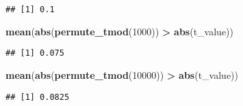 \documentclass[
]{article}
\newenvironment{Shaded}{\begin{snugshade}}{\end{snugshade}}
\newcommand{\ControlFlowTok}[1]{\textcolor[rgb]{0.13,0.29,0.53}{\textbf{#1}}}
\newcommand{\DataTypeTok}[1]{\textcolor[rgb]{0.13,0.29,0.53}{#1}}
\newcommand{\DecValTok}[1]{\textcolor[rgb]{0.00,0.00,0.81}{#1}}
\newcommand{\KeywordTok}[1]{\textcolor[rgb]{0.13,0.29,0.53}{\textbf{#1}}}
\newcommand{\NormalTok}[1]{#1}
\newcommand{\OperatorTok}[1]{\textcolor[rgb]{0.81,0.36,0.00}{\textbf{#1}}}
\newcommand{\StringTok}[1]{\textcolor[rgb]{0.31,0.60,0.02}{#1}}
\begin{document}
\begin{Shaded}
\end{Shaded}

\begin{verbatim}
## [1] 0.1
\end{verbatim}

\begin{Shaded}
\begin{Highlighting}[]
\KeywordTok{mean}\NormalTok{(}\KeywordTok{abs}\NormalTok{(}\KeywordTok{permute_tmod}\NormalTok{(}\DecValTok{1000}\NormalTok{)) }\OperatorTok{>}\StringTok{ }\KeywordTok{abs}\NormalTok{(t_value)) }
\end{Highlighting}
\end{Shaded}

\begin{verbatim}
## [1] 0.075
\end{verbatim}

\begin{Shaded}
\begin{Highlighting}[]
\KeywordTok{mean}\NormalTok{(}\KeywordTok{abs}\NormalTok{(}\KeywordTok{permute_tmod}\NormalTok{(}\DecValTok{10000}\NormalTok{)) }\OperatorTok{>}\StringTok{ }\KeywordTok{abs}\NormalTok{(t_value)) }
\end{Highlighting}
\end{Shaded}

\begin{verbatim}
## [1] 0.0825
\end{verbatim}
\end{document}
